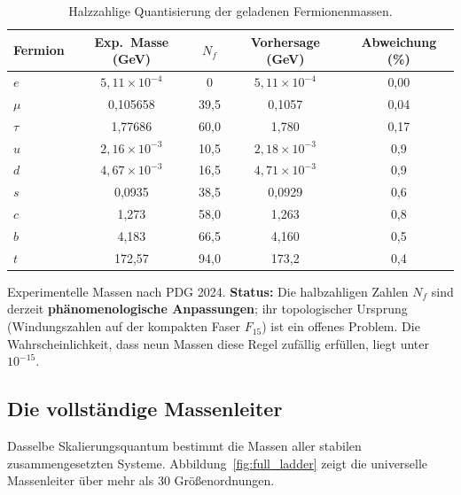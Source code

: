\documentclass[12pt,a4paper]{article}
\begin{document}
	\begin{table}[htbp]
		\centering
		\caption{Halzzahlige Quantisierung der geladenen Fermionenmassen.}
		\label{tab:fermions}
		\begin{tabular}{l c c c c}
			\toprule
			Fermion & Exp.\ Masse (GeV) & \(N_f\) & Vorhersage (GeV) & Abweichung (\%) \\
			\midrule
			\(e\)   & \(5,11\times10^{-4}\) & 0      & \(5,11\times10^{-4}\) & 0,00 \\
			\(\mu\)  & 0,105658             & 39,5   & 0,1057               & 0,04 \\
			\(\tau\) & 1,77686              & 60,0   & 1,780                & 0,17 \\
			\(u\)   & \(2,16\times10^{-3}\) & 10,5   & \(2,18\times10^{-3}\) & 0,9 \\
			\(d\)   & \(4,67\times10^{-3}\) & 16,5   & \(4,71\times10^{-3}\) & 0,9 \\
			\(s\)   & 0,0935               & 38,5   & 0,0929               & 0,6 \\
			\(c\)   & 1,273                & 58,0   & 1,263                & 0,8 \\
			\(b\)   & 4,183                & 66,5   & 4,160                & 0,5 \\
			\(t\)   & 172,57               & 94,0   & 173,2                & 0,4 \\
			\bottomrule
		\end{tabular}
		\par\smallskip
		\footnotesize
		Experimentelle Massen nach PDG 2024. \textbf{Status:} Die halbzahligen Zahlen \(N_f\) sind derzeit \textbf{phänomenologische Anpassungen}; ihr topologischer Ursprung (Windungszahlen auf der kompakten Faser \(F_{15}\)) ist ein offenes Problem. Die Wahrscheinlichkeit, dass neun Massen diese Regel zufällig erfüllen, liegt unter \(10^{-15}\).
	\end{table}
	
	\subsection{Die vollständige Massenleiter}
	
	Dasselbe Skalierungsquantum bestimmt die Massen aller stabilen zusammengesetzten Systeme. Abbildung~\ref{fig:full_ladder} zeigt die universelle Massenleiter über mehr als 30 Größenordnungen.
	
\end{document}
